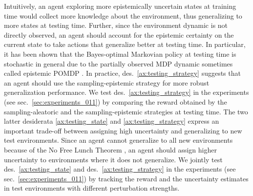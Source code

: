 Intuitively, an agent exploring more epistemically uncertain states at training time would collect more knowledge about the environment, thus generalizing to more states at testing time. Further, since the environment dynamic is not directly observed, an agent should account for the epistemic certainty on the current state to take actions that generalize better at testing time. In particular, it has been shown that the Bayes-optimal Markovian policy at testing time is stochastic in general due to the partially observed MDP dynamic sometimes called epistemic POMDP \citep{epistemic-pomdp}. In practice, des.~\ref{ax:testing_strategy} suggests that an agent should use the sampling-epistemic strategy for more robust generalization performance. We test des.~\ref{ax:testing_strategy} in the experiments (see sec.~\ref{sec:experiments_011}) by comparing the reward obtained by the sampling-aleatoric and the sampling-epistemic strategies at testing time. The two latter desiderata \ref{ax:testing_state} and \ref{ax:testing_strategy} express an important trade-off between assigning high uncertainty and generalizing to new test environments. Since an agent cannot generalize to all new environments because of the No Free Lunch Theorem \citep{no-free-lunch-theorem-optimization}, an agent should assign higher uncertainty to environments where it does not generalize. We jointly test des.~\ref{ax:testing_state} and des.~\ref{ax:testing_strategy} in the experiments (see sec.~\ref{sec:experiments_011}) by tracking the reward and the uncertainty estimates in test environments with different perturbation strengths.
